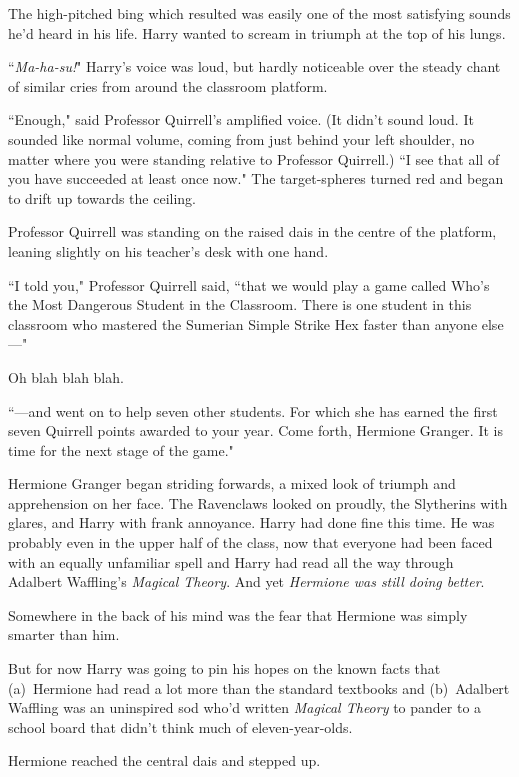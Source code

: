 The high-pitched bing which resulted was easily one of the most satisfying sounds he'd heard in his life. Harry wanted to scream in triumph at the top of his lungs. \emph{}

``\emph{Ma-ha-su!}" Harry's voice was loud, but hardly noticeable over the steady chant of similar cries from around the classroom platform.

``Enough," said Professor Quirrell's amplified voice. (It didn't sound loud. It sounded like normal volume, coming from just behind your left shoulder, no matter where you were standing relative to Professor Quirrell.) ``I see that all of you have succeeded at least once now." The target-spheres turned red and began to drift up towards the ceiling.

Professor Quirrell was standing on the raised dais in the centre of the platform, leaning slightly on his teacher's desk with one hand.

``I told you," Professor Quirrell said, ``that we would play a game called Who's the Most Dangerous Student in the Classroom. There is one student in this classroom who mastered the Sumerian Simple Strike Hex faster than anyone else—"

Oh blah blah blah.

``—and went on to help seven other students. For which she has earned the first seven Quirrell points awarded to your year. Come forth, Hermione Granger. It is time for the next stage of the game."

Hermione Granger began striding forwards, a mixed look of triumph and apprehension on her face. The Ravenclaws looked on proudly, the Slytherins with glares, and Harry with frank annoyance. Harry had done fine this time. He was probably even in the upper half of the class, now that everyone had been faced with an equally unfamiliar spell and Harry had read all the way through Adalbert Waffling's \emph{Magical Theory}. And yet \emph{Hermione was still doing better}.

Somewhere in the back of his mind was the fear that Hermione was simply smarter than him.

But for now Harry was going to pin his hopes on the known facts that (a)~Hermione had read a lot more than the standard textbooks and (b)~Adalbert Waffling was an uninspired sod who'd written \emph{Magical Theory} to pander to a school board that didn't think much of eleven-year-olds.

Hermione reached the central dais and stepped up.

